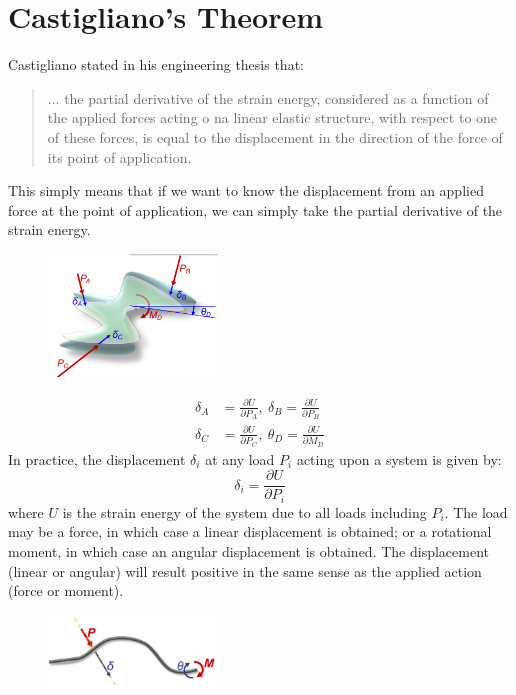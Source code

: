 \documentclass[class=report, crop=false, 12pt,a4paper]{standalone}
\begin{document}
\section{Castigliano's Theorem}
Castigliano stated in his engineering thesis that:
\begin{quotation}
  ... the partial derivative of the strain energy, considered as a function of the applied forces acting o na linear elastic structure, with respect to one of these forces, is equal to the displacement in the direction of the force of its point of application.
\end{quotation}
This simply means that if we want to know the displacement from an applied force at the point of application, we can simply take the partial derivative of the strain energy.
\begin{figure}[H]
  \centering
  \includegraphics[width = 0.4\textwidth]{../img/diagram13.png}
  \caption{}
\end{figure}
\begin{align}
  \delta_A &= \frac{\partial U}{\partial P_A}, \ \delta_B = \frac{\partial U}{\partial P_B}\\
  \delta_C &= \frac{\partial U}{\partial P_C}, \ \theta_D = \frac{\partial U}{\partial M_D}
\end{align}
In practice, the displacement $\delta_i$ at any load $P_i$ acting upon a system is given by:
\begin{equation}
  \delta_i = \frac{\partial U}{\partial P_i}
\end{equation}
where $U$ is the strain energy of the system due to all loads including $P_i$. The load may be a force, in which case a linear displacement is obtained; or a rotational moment, in which case an angular displacement is obtained. The displacement (linear or angular) will result positive in the same sense as the applied action (force or moment).
\begin{figure}[H]
  \centering
  \includegraphics[width = 0.4\textwidth]{../img/diagram14.png}
  \caption{}
\end{figure}
\end{document}
